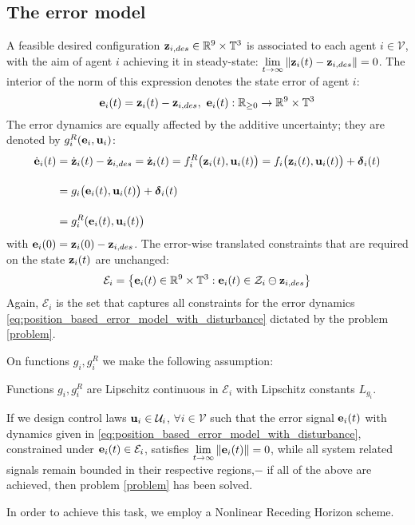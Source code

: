 \subsection{The error model}

A feasible desired configuration
$\bm{\mathbf{z}}_{i,des} \in \mathbb{R}^9 \times \mathbb{T}^3$
is associated to each agent $i \in \mathcal{V}$, with the aim of agent $i$
achieving it in steady-state:
$\lim\limits_{t \to \infty} \|\bm{\mathbf{z}}_i(t) - \bm{\mathbf{z}}_{i,des}\| = 0$. The
interior of the norm of this expression denotes the state error of agent $i$:
$$\bm{\mathbf{e}}_i(t) = \bm{\mathbf{z}}_i(t) - \bm{\mathbf{z}}_{i,des},\ \bm{\mathbf{e}}_i(t) :
\mathbb{R}_{\geq 0} \to \mathbb{R}^9 \times \mathbb{T}^3$$
The error dynamics are equally affected by the additive uncertainty;
they are denoted by $g_i^R(\bm{\mathbf{e}}_i, \bm{\mathbf{u}}_i)$:
\begin{align}
  \dot{\bm{\mathbf{e}}}_i(t) &= \dot{\bm{\mathbf{z}}}_i(t) - \dot{\bm{\mathbf{z}}}_{i,des} =
  \dot{\bm{\mathbf{z}}}_i(t) = f_i^R\big(\bm{\mathbf{z}}_i(t), \bm{\mathbf{u}}_i(t)\big) =  f_i \big(\bm{\mathbf{z}}_i (t), \bm{\mathbf{u}}_i (t)\big) + \bm{\mathbf{\delta}}_i(t) \\[2.5ex]
  &=g_i \big(\bm{\mathbf{e}}_i (t), \bm{\mathbf{u}}_i (t)\big) + \bm{\mathbf{\delta}}_i(t) \\[2.5ex]
                      &= g_i^R(\bm{\mathbf{e}}_i(t), \bm{\mathbf{u}}_i(t)\big)
    \label{eq:position_based_error_model_with_disturbance}
\end{align}
with $\bm{\mathbf{e}}_i(0) = \bm{\mathbf{z}}_i(0) - \bm{\mathbf{z}}_{i,des}$.
The error-wise translated constraints that are required on the state
$\bm{\mathbf{z}}_i(t)$ are unchanged:
$$\mathcal{E}_i = \big\{\bm{\mathbf{e}}_i(t) \in \mathbb{R}^9 \times \mathbb{T}^3 :
\bm{\mathbf{e}}_i(t) \in \mathcal{Z}_i \ominus \bm{\mathbf{z}}_{i,des} \big\}$$
Again, $\mathcal{E}_i $ is the set that captures all constraints for the error
dynamics \eqref{eq:position_based_error_model_with_disturbance} dictated
by the problem \eqref{problem}.

On functions $g_i, g^R_i$ we make the following assumption:
\begin{bw_box}
  \begin{assumption}
  \label{ass:g_i_g_R_Lipschitz}

    Functions $g_i, g^R_i$ are Lipschitz continuous in $\mathcal{E}_i$
    with Lipschitz constants $L_{g_i}$.

\end{assumption}
\end{bw_box}

If we design control laws $\bm{\mathbf{u}}_i \in \mathcal{U}_i$,
$\forall i \in \mathcal{V}$ such that the error signal $\bm{\mathbf{e}}_i(t)$ with
dynamics given in \eqref{eq:position_based_error_model_with_disturbance}, constrained under
$\bm{\mathbf{e}}_i(t) \in \mathcal{E}_i$, satisfies
$\lim\limits_{t \to \infty} \|\bm{\mathbf{e}}_i(t)\| = 0$, while all system related
signals remain bounded in their respective regions,$-$ if all of the above are
achieved, then problem \eqref{problem} has been solved.

In order to achieve this task, we employ a Nonlinear Receding Horizon scheme.
